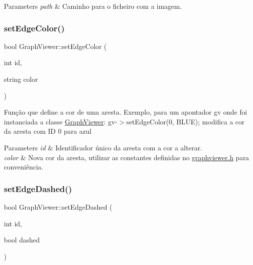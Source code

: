 \begin{DoxyParams}{Parameters}
{\em path} & Caminho para o ficheiro com a imagem. \\
\hline
\end{DoxyParams}
\mbox{\label{class_graph_viewer_a07ccc96707efae4aa5f3ced3dca015af}} 
\subsubsection{\texorpdfstring{setEdgeColor()}{setEdgeColor()}}
{\footnotesize\ttfamily bool Graph\+Viewer\+::set\+Edge\+Color (\begin{DoxyParamCaption}\item[{int}]{id,  }\item[{string}]{color }\end{DoxyParamCaption})}

Função que define a cor de uma aresta. Exemplo, para um apontador gv onde foi instanciada a classe \mbox{\hyperlink{class_graph_viewer}{Graph\+Viewer}}\+: gv-\/$>$set\+Edge\+Color(0, B\+L\+U\+E); modifica a cor da aresta com ID 0 para azul


\begin{DoxyParams}{Parameters}
{\em id} & Identificador único da aresta com a cor a alterar. \\
\hline
{\em color} & Nova cor da aresta, utilizar as constantes definidas no \mbox{\hyperlink{graphviewer_8h_source}{graphviewer.\+h}} para conveniência. \\
\hline
\end{DoxyParams}
\mbox{\label{class_graph_viewer_a1698f1c6b3a8e7cabc7b7d7cf42fc7f0}} 
\subsubsection{\texorpdfstring{setEdgeDashed()}{setEdgeDashed()}}
{\footnotesize\ttfamily bool Graph\+Viewer\+::set\+Edge\+Dashed (\begin{DoxyParamCaption}\item[{int}]{id,  }\item[{bool}]{dashed }\end{DoxyParamCaption})}

